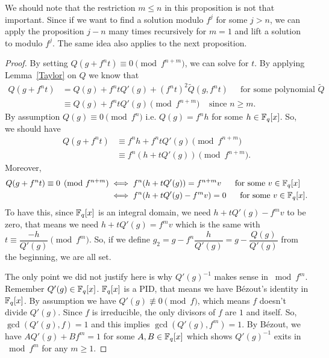 \documentclass[11pt,reqno]{amsart}
\begin{document}
\begin{remark}
We should note that the restriction $m \leqslant n$ in this proposition is not that important. Since if we want to find a solution modulo $f^{j}$ for some $j > n$, we can apply the proposition $j-n$ many times recursively for $m=1$ and lift a solution to modulo $f^{j}$. The same idea also applies to the next proposition. 
\end{remark}
\begin{proof} 
By setting $Q(g+f^{n}t) \equiv 0 \pmod{f^{n+m}}$, we can solve for $t$. By applying Lemma~\ref{Taylor} on $Q$ we know that 
\begin{align*} Q(g+f^{n}t) &= Q(g)+f^{n}t Q'(g)+(f^{n}t)^2 \tilde{Q}(g,f^nt) \ \ \ \ \ \text{ for some polynomial } \tilde{Q} \\
&\equiv Q(g)+f^{n}t Q'(g) \pmod{f^{n+m}} \ \ \ \ \ \text{since } n \geqslant m.
\end{align*}
By assumption $Q(g) \equiv 0 \pmod{f^n}$ i.e. $Q(g)= f^nh$ for some $h \in \Bbb F_q[x]$. So, we should have
\begin{align*}Q(g+f^{n}t) &\equiv f^nh+f^ntQ'(g) \pmod{f^{n+m}} \\
&\equiv f^n(h+tQ'(g))  \pmod{f^{n+m}}.
\end{align*}
Moreover, 
\begin{align*} Q(g+f^{n}t) \equiv 0 \pmod{f^{n+m}} &\iff f^n(h+tQ'(g))=f^{n+m}v \ \ \ \ \text{ for some } v \in \Bbb F_q[x]\\
&\iff f^n(h+tQ'(g)-f^{m}v)=0 \ \ \ \ \text{ for some } v \in \Bbb F_q[x].
\end{align*}
To have this, since $\Bbb F_q[x]$ is an integral domain, we need $h+tQ'(g)-f^{m}v$ to be zero, that means we need $h+tQ'(g)=f^{m}v$ which is the same with $t \equiv \dfrac{-h}{Q'(g)} \pmod{f^{m}}$. So, if we define $g_{2}=g-f^n \dfrac{h}{Q'(g)}=g- \dfrac{Q(g)}{Q'(g)}$ from the beginning, we are all set. 

The only point we did not justify here is why $Q'(g)^{-1}$ makes sense in $\bmod{f^m}$. Remember $Q'(g) \in \Bbb F_q[x]$. $\Bbb F_q[x]$ is a PID, that means we have B\'ezout's identity in $\Bbb F_q[x]$. By assumption we have $Q'(g) \not \equiv 0 \pmod{f}$, which means $f$ doesn't divide $Q'(g)$. Since $f$ is irreducible, the only divisors of $f$ are $1$ and itself. So, $\gcd(Q'(g),f)=1$ and this implies $\gcd(Q'(g),f^m)=1$. By B\'ezout, we have $AQ'(g)+Bf^m=1$ for some $A,B \in \Bbb F_q[x]$ which shows $Q'(g)^{-1}$ exits in $\bmod{f^m}$ for any $m \geqslant 1$.
\end{proof}
\end{document}
